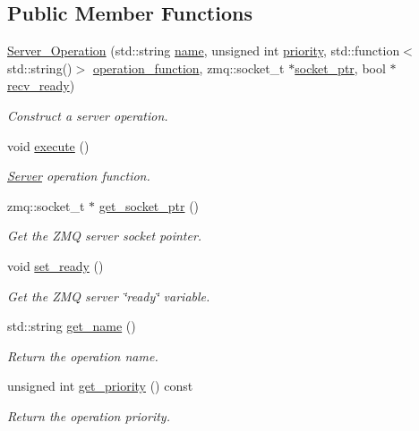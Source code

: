 \subsection*{Public Member Functions}
\begin{DoxyCompactItemize}
\item 
\hyperlink{classzcm_1_1Server__Operation_a8457695fe5f8f3416106596597695406}{Server\+\_\+\+Operation} (std\+::string \hyperlink{classzcm_1_1Base__Operation_a2e2192550818d8f063fc7b2c76c5e21c}{name}, unsigned int \hyperlink{classzcm_1_1Base__Operation_a38af3bcc2578ef215772d595bf3fa358}{priority}, std\+::function$<$ std\+::string()$>$ \hyperlink{classzcm_1_1Server__Operation_a9fe0d75b858647a21323293746df6c9e}{operation\+\_\+function}, zmq\+::socket\+\_\+t $\ast$\hyperlink{classzcm_1_1Server__Operation_a07efad79c512d03a54fe2bb99166d52f}{socket\+\_\+ptr}, bool $\ast$\hyperlink{classzcm_1_1Server__Operation_a2b71778be842aedf6d122b531e186ca8}{recv\+\_\+ready})
\begin{DoxyCompactList}\small\item\em Construct a server operation. \end{DoxyCompactList}\item 
void \hyperlink{classzcm_1_1Server__Operation_acd6b89c42aad3df5dc78674770326498}{execute} ()
\begin{DoxyCompactList}\small\item\em \hyperlink{classzcm_1_1Server}{Server} operation function. \end{DoxyCompactList}\item 
zmq\+::socket\+\_\+t $\ast$ \hyperlink{classzcm_1_1Server__Operation_a17d90d76a8cfa0dc25792144e155e7c0}{get\+\_\+socket\+\_\+ptr} ()
\begin{DoxyCompactList}\small\item\em Get the Z\+MQ server socket pointer. \end{DoxyCompactList}\item 
void \hyperlink{classzcm_1_1Server__Operation_a1477e76e1639bdebc6b855d3be4e9fb2}{set\+\_\+ready} ()
\begin{DoxyCompactList}\small\item\em Get the Z\+MQ server \char`\"{}ready\char`\"{} variable. \end{DoxyCompactList}\item 
std\+::string \hyperlink{classzcm_1_1Base__Operation_a46b6a3f23e18bc35425ec2dab80c849f}{get\+\_\+name} ()
\begin{DoxyCompactList}\small\item\em Return the operation name. \end{DoxyCompactList}\item 
unsigned int \hyperlink{classzcm_1_1Base__Operation_a3b15b35c31ed173d2abb193e9fba32ef}{get\+\_\+priority} () const 
\begin{DoxyCompactList}\small\item\em Return the operation priority. \end{DoxyCompactList}\end{DoxyCompactItemize}

